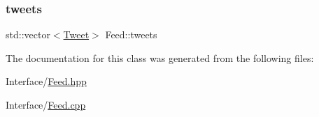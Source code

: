 \mbox{\label{class_feed_a8afb1f424999ddaec50fcea891798e9c}} 
\subsubsection{\texorpdfstring{tweets}{tweets}}
{\footnotesize\ttfamily std\+::vector$<$\hyperlink{class_tweet}{Tweet}$>$ Feed\+::tweets\hspace{0.3cm}{\ttfamily [private]}}



The documentation for this class was generated from the following files\+:\begin{DoxyCompactItemize}
\item 
Interface/\hyperlink{_feed_8hpp}{Feed.\+hpp}\item 
Interface/\hyperlink{_feed_8cpp}{Feed.\+cpp}\end{DoxyCompactItemize}
